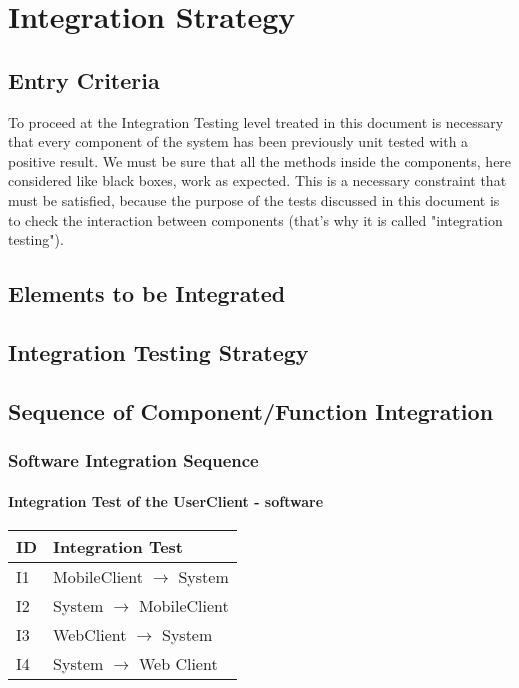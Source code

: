 \section{Integration Strategy}
	\subsection{Entry Criteria}
	To proceed at the Integration Testing level treated in this document is necessary that every
	component of the system has been previously unit tested with a positive result.
	We must be sure that all the methods inside the components, here considered like black boxes,
	work as expected.
	This is a necessary constraint that must be satisfied, because the purpose of the tests discussed in this
	document is to check the interaction between components (that's why it is called "integration testing").
	\subsection{Elements to be Integrated}
	\subsection{Integration Testing Strategy}
	\subsection{Sequence of Component/Function Integration}
		\subsubsection{Software Integration Sequence}
		\paragraph{Integration Test of the UserClient - software}
		\begin{tabular}{p{2cm} | p{10cm}}
			\hline
			\textbf{ID} & \textbf{Integration Test} \\
			\hline
			I1 & MobileClient $\rightarrow$ System \\
			\hline
			I2 & System $\rightarrow$ MobileClient \\
			\hline
			I3 & WebClient $\rightarrow$ System \\
			\hline
			I4 & System $\rightarrow$ Web Client \\
			\hline
		\end{tabular}
